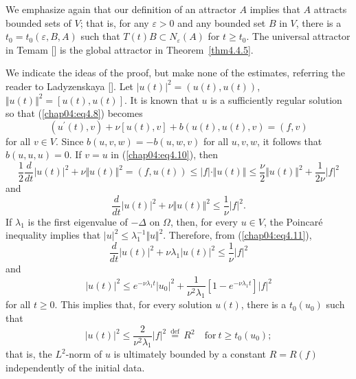 \documentclass{surv-l}
\theoremstyle{plain}
\theoremstyle{definition}
\numberwithin{equation}{section}
\numberwithin{figure}{chapter}
\begin{document}
We emphasize again that our definition of an attractor $A$ implies that $A$ attracts bounded sets of $V$; that is, for any $\varepsilon >0$ and any bounded set $B$ in $V$, there is a $t_{0}=t_{0}(\varepsilon, B, A)$ such that $T(t)B\subset N_{\varepsilon}(A)$ for $t\geq t_{0}$. The universal attractor in Temam [\citeyear{1984t}] is the global attractor in Theorem~\ref{thm4.4.5}.

We indicate the ideas of the proof, but make none of the estimates, referring the reader to Ladyzenskaya [\citeyear{1972l}]. Let $|u(t)|^{2}=(u(t), u(t))$, $\Vert u(t)\Vert^{2}= [u(t), u(t)]$. It is known that $u$ is a sufficiently regular solution so that (\ref{chap04:eq4.8}) becomes
\begin{equation}\label{chap04:eq4.10}
(u^{\prime}(t), v)+\nu[u(t), v]+b(u(t), u(t), v)=(f, v)
\end{equation}
for all $v\in V$. Since $b(u, v, w)=-b(u, w, v)$ for all $u, v, w$, it follows that $b(u, u, u)=0$. If $v=u$ in (\ref{chap04:eq4.10}), then
\begin{equation*}
\frac{1}{2}\frac{d}{dt}|u(t)|^{2}+\nu\Vert u(t)\Vert^{2}=(f, u(t))\leq|f|\cdot \Vert u(t)\Vert\leq\frac{\nu}{2}\Vert u(t)\Vert^{2}+\frac{1}{2\nu}|f|^{2}
\end{equation*}
and
\begin{equation}\label{chap04:eq4.11}
\frac{d}{dt}|u(t)|^{2}+\nu\Vert u(t)\Vert^{2}\leq\frac{1}{\nu}|f|^{2}.
\end{equation}
If $\lambda_{1}$ is the first eigenvalue of $-\Delta$ on $\Omega$, then, for every $u\in V$, the Poincar\'{e} inequality implies that $|u|^{2}\leq\lambda_{1}^{-1}\Vert u\Vert^{2}$. Therefore, from (\ref{chap04:eq4.11}),
\begin{equation*}
\frac{d}{dt}|u(t)|^{2}+\nu\lambda_{1}|u(t)|^{2}\leq\frac{1}{\nu}|f|^{2}
\end{equation*}
and
\begin{equation}\label{chap04:eq4.12}
|u(t)|^{2}\leq e^{-\nu\lambda_{1}t}|u_{0}|^{2}+\frac{1}{\nu^{2}\lambda_{1}}[1-e^{-\nu\lambda_{1}t}]|f|^{2}
\end{equation}
for all $t\geq 0$. This implies that, for every solution $u(t)$, there is a $t_{0}(u_{0})$ such that
\begin{equation}\label{chap04:eq4.13}
|u(t)|^{2}\leq\frac{2}{\nu^{2}\lambda_{1}}|f|^{2}\,{\overset{\mathrm{def}}=}\, R^{2}\quad \mathrm{for}\ t\geq t_{0}(u_{0});
\end{equation}
that is, the $L^{2}$-norm of $u$ is ultimately bounded by a constant $R=R(f)$ independently of the initial data.
\end{document}

